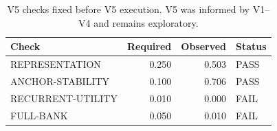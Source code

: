 \begin{table}[t]
\centering
\small
\caption{V5 checks fixed before V5 execution. V5 was informed by V1--V4 and remains exploratory.}
\label{tab:v5-hypotheses}
\begin{tabular}{lrrl}
\toprule
Check & Required & Observed & Status \\
\midrule
REPRESENTATION & 0.250 & 0.503 & PASS \\
ANCHOR-STABILITY & 0.100 & 0.706 & PASS \\
RECURRENT-UTILITY & 0.010 & 0.000 & FAIL \\
FULL-BANK & 0.050 & 0.010 & FAIL \\
\bottomrule
\end{tabular}
\end{table}
